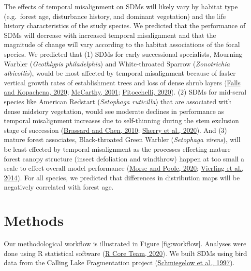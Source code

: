 \documentclass[
]{article}
\begin{document}
The effects of temporal misalignment on SDMs will likely vary by habitat type (e.g.~forest age, disturbance history, and dominant vegetation) and the life history characteristics of the study species. We predicted that the performance of SDMs will decrease with increased temporal misalignment and that the magnitude of change will vary according to the habitat associations of the focal species. We predicted that (1) SDMs for early successional specialists, Mourning Warbler (\emph{Geothlypis philadelphia}) and White-throated Sparrow (\emph{Zonotrichia albicollis}), would be most affected by temporal misalignment because of faster vertical growth rates of establishment trees and loss of dense shrub layers (\protect\hyperlink{ref-fallsWhitethroatedSparrowZonotrichia2020}{Falls and Kopachena, 2020}; \protect\hyperlink{ref-mccarthy2001gap}{McCarthy, 2001}; \protect\hyperlink{ref-pitocchelliMourningWarblerGeothlypis2020}{Pitocchelli, 2020}). (2) SDMs for mid-seral species like American Redstart (\emph{Setophaga ruticilla}) that are associated with dense midstory vegetation, would see moderate declines in performance as temporal misalignment increases due to self-thinning during the stem exclusion stage of succession (\protect\hyperlink{ref-brassardStandStructureComposition2010}{Brassard and Chen, 2010}; \protect\hyperlink{ref-sherryAmericanRedstartSetophaga2020a}{Sherry et al., 2020}). And (3) mature forest associates, Black-throated Green Warbler (\emph{Setophaga virens}), will be least effected by temporal misalignment as the processes effecting mature forest canopy structure (insect defoliation and windthrow) happen at too small a scale to effect overall model performance (\protect\hyperlink{ref-morseBlackthroatedGreenWarbler2020}{Morse and Poole, 2020}; \protect\hyperlink{ref-VierlingSwift2014}{Vierling et al., 2014}). For all species, we predicted that differences in distribution maps will be negatively correlated with forest age.

\hypertarget{methods}{%
\section{Methods}\label{methods}}

Our methodological workflow is illustrated in Figure \ref{fig:workflow}. Analyses were done using R statistical software (\protect\hyperlink{ref-R-base}{R Core Team, 2020}). We built SDMs using bird data from the Calling Lake Fragmentation project (\protect\hyperlink{ref-Schmiegelow1997}{Schmiegelow et al., 1997}).
\end{document}
